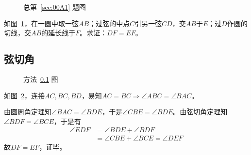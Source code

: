 

\begin{figure}[htbp]
  \centering {}
  \caption{总第~\ref{sec:00A1} 题图} \label{fig:00A1}
\end{figure}

如图~\ref{fig:00A1}，在一圆中取一弦$AB$；过弦的中点$C$引另一弦$CD$，交$AB$于$E$；过$D$作圆的切线，交$AB$的延长线于$F$。求证：$DF = EF$。

\subsection{弦切角} \label{subsec:00A1-circ}

\begin{figure}[htbp]
  \centering {}
  \caption{方法~\ref{subsec:00A1-circ} 图} \label{fig:00A1-circ}
\end{figure}

如图~\ref{fig:00A1-circ}，连接$AC, BC, BD$，易知$AC = BC \Rightarrow \angle ABC = \angle BAC$。

由圆周角定理知$\angle BAC = \angle BDE$，于是$\angle CBE = \angle BDE$。由弦切角定理知$\angle BDF = \angle BCE$，于是有
\begin{align*}
  \angle EDF &= \angle BDE + \angle BDF \\
  &= \angle CBE + \angle BCE = \angle DEF
\end{align*}
故$DF = EF$，证毕。
